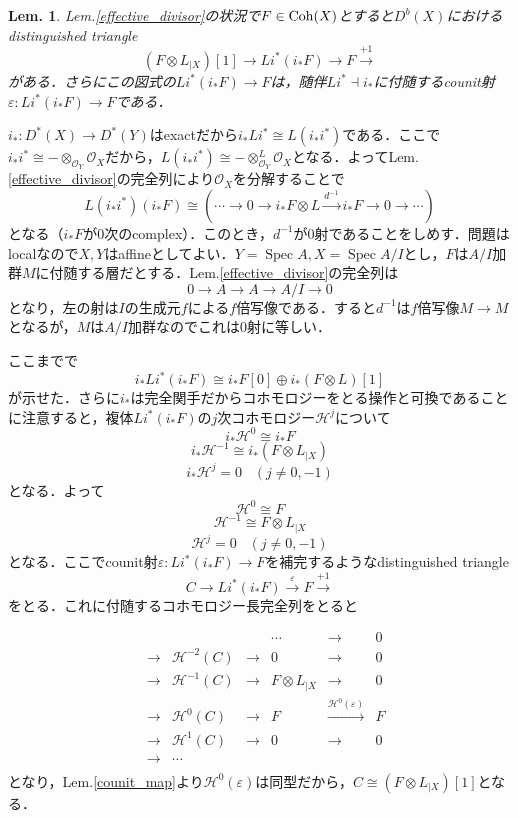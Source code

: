 \documentclass[uplatex,a4paper,11pt,dvipdfmx]{jsarticle}
\makeatletter
\theoremstyle{mystyle} %
\newtheorem{lemma}[theorem]{Lem.}
\renewenvironment{proof}[1][\proofname]{\par
 \pushQED{\qed}%
 \normalfont \topsep6\p@\@plus6\p@\relax
 \trivlist
 \item[\hskip\labelsep
 \itshape
 {\bf\underline{#1}}]\ignorespaces
}{%
 \popQED\endtrivlist\@endpefalse
}
\DeclareMathOperator{\Spec}{Spec}
\makeatother
\begin{document}
\begin{lemma}\label{pullback}
	Lem.\ref{effective_divisor}の状況で$F \in \operatorname{Coh}(X)$とすると$D^b(X)$におけるdistinguished triangle
	$$(F\otimes L_{|X})[1] \to Li^*(i_*F) \to F \xrightarrow{+1}$$がある．さらにこの図式の$Li^*(i_*F) \to F$は，随伴$Li^* \dashv i_*$に付随するcounit射$\varepsilon \colon Li^*(i_*F) \to F$である．
\end{lemma}
\begin{proof}
	$i_* \colon D^*(X) \to D^*(Y)$はexactだから$i_*Li^* \cong L(i_*i^*)$である．ここで$i_*i^* \cong -\otimes_{\mathcal{O}_Y}\mathcal{O}_X$だから，$L(i_*i^*) \cong -\otimes^L_{\mathcal{O}_Y}\mathcal{O}_X$となる．よってLem.\ref{effective_divisor}の完全列により$\mathcal{O}_X$を分解することで$$L(i_*i^*)(i_*F) \cong (\cdots \to 0 \to i_*F\otimes L \xrightarrow{d^{-1}} i_*F \to 0 \to \cdots)$$となる（$i_*F$が$0$次のcomplex）．このとき，$d^{-1}$が$0$射であることをしめす．問題はlocalなので$X, Y$はaffineとしてよい．$Y=\Spec{A}, X = \Spec{A/I}$とし，$F$は$A/I$加群$M$に付随する層だとする．Lem.\ref{effective_divisor}の完全列は$$0 \to A \to A \to A/I \to 0$$となり，左の射は$I$の生成元$f$による$f$倍写像である．すると$d^{-1}$は$f$倍写像$M \to M$となるが，$M$は$A/I$加群なのでこれは$0$射に等しい．

	ここまでで$$i_*Li^*(i_*F) \cong i_*F[0] \oplus i_*(F\otimes L)[1]$$が示せた．さらに$i_*$は完全関手だからコホモロジーをとる操作と可換であることに注意すると，複体$Li^*(i_*F)$の$j$次コホモロジー$\mathcal{H}^j$について$$i_*\mathcal{H}^0 \cong i_*F$$$$i_*\mathcal{H}^{-1}\cong i_*(F \otimes L_{|X})$$$$i_*\mathcal{H}^j = 0 \hspace{10pt}(j \neq 0, -1)$$となる．よって$$\mathcal{H}^0 \cong F$$$$\mathcal{H}^{-1}\cong F \otimes L_{|X}$$$$\mathcal{H}^j = 0 \hspace{10pt}(j \neq 0, -1)$$となる．ここでcounit射$\varepsilon \colon Li^*(i_*F) \to F$を補完するようなdistinguished triangle$$C\to Li^*(i_*F) \xrightarrow{\varepsilon} F \xrightarrow{+1}$$をとる．これに付随するコホモロジー長完全列をとると

	\[
		\begin{array}{ccccccc}
			 &     &                     &     & \cdots           & \to                                      & 0 \\
			 & \to & \mathcal{H}^{-2}(C) & \to & 0                & \to                                      & 0 \\
			 & \to & \mathcal{H}^{-1}(C) & \to & F \otimes L_{|X} & \to                                      & 0 \\
			 & \to & \mathcal{H}^{0}(C)  & \to & F                & \xrightarrow{\mathcal{H}^0(\varepsilon)} & F \\
			 & \to & \mathcal{H}^{1}(C)  & \to & 0                & \to                                      & 0 \\
			 & \to & \cdots              &     &                  &                                          &   \\
		\end{array}
	\]
	となり，Lem.\ref{counit_map}より$\mathcal{H}^0(\varepsilon)$は同型だから，$C \cong (F \otimes L_{|X})[1]$となる．
\end{proof}
\end{document}
